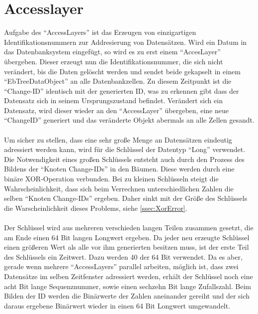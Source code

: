\documentclass[a4paper,11pt,oneside,%
headsepline,												%
footsepline,												%
bibtotocnumbered									%
]{scrreprt}
\begin{document}
\section{Accesslayer}
Aufgabe des \enquote{AccessLayers} ist das Erzeugen von einzigartigen Identifikationsnummern zur Addresierung von Datensätzen. Wird ein Datum in das Datenbanksystem eingefügt, so wird es zu erst einem \enquote{AccesLayer} übergeben. Dieser erzeugt nun die Identifikationsnummer, die sich nicht verändert, bis die Daten gelöscht werden und sendet beide gekapselt in einem \enquote{EbTreeDataObject} an alle Datenbankzellen. Zu diesem Zeitpunkt ist die \enquote{Change-ID} identisch mit der generierten ID, was zu erkennen gibt dass der Datensatz sich in seinem Ursprungszustand befindet. Verändert sich ein Datensatz, wird dieser wieder an den \enquote{AccessLayer} übergeben, eine neue \enquote{ChangeID} generiert und das veränderte Objekt abermals an alle Zellen gesandt.\\\\
Um sicher zu stellen, dass eine sehr große Menge an Datensätzen eindeutig adressiert werden kann, wird für die Schlüssel der Datentyp \enquote{Long} verwendet. Die Notwendigkeit eines großen Schlüssels entsteht auch durch den Prozess des Bildens der \enquote{Knoten Change-IDs} in den Bäumen. Diese werden durch eine binäre XOR-Operation verbunden. Bei zu kleinen Schlüsseln steigt die Wahrscheinlichkeit, dass sich beim Verrechnen unterschiedlichen Zahlen die selben \enquote{Knoten Change-IDs} ergeben. Daher sinkt mit der Größe des Schlüssels die Warscheinlichkeit dieses Problems, siehe \autoref{ssec:XorError}.\\\\
Der Schlüssel wird aus mehreren verschieden langen Teilen zusammen gesetzt, die am Ende einen 64 Bit langen Longwert ergeben. Da jeder neu erzeugte Schlüssel einen größeren Wert als alle vor ihm generierten besitzen muss, ist der erste Teil des Schlüssels ein Zeitwert. Dazu werden 40 der 64 Bit verwendet. Da es aber, gerade wenn mehrere \enquote{AccessLayers} parallel arbeiten, möglich ist, dass zwei Datensätze im selben Zeitfenster adressiert werden, erhält der Schlüssel noch eine acht Bit lange Sequenznummer, sowie einen sechzehn Bit lange Zufallszahl. Beim Bilden der ID werden die Binärwerte der Zahlen aneinander gereiht und der sich daraus ergebene Binärwert wieder in einen 64 Bit Longwert umgewandelt.
\end{document}
